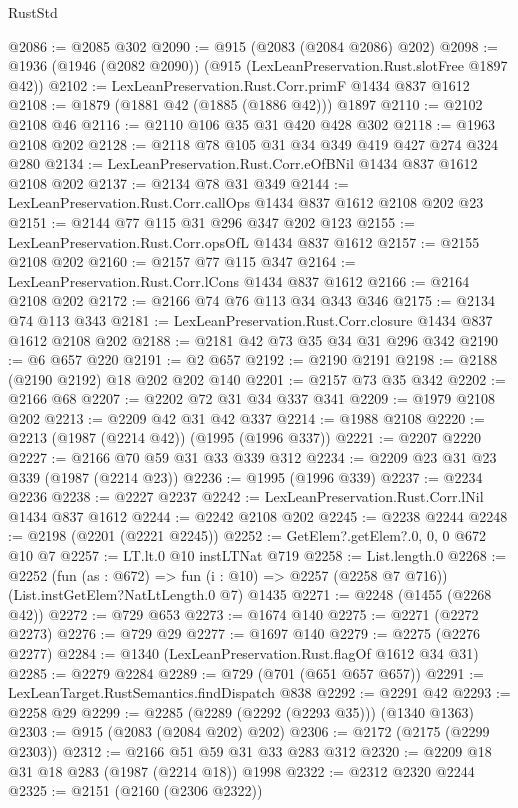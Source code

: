 \begin{lexlean}{RustStd}
\begin{coremodule}
@2086 := @2085 @302
@2090 := @915 (@2083 (@2084 @2086) @202)
@2098 := @1936 (@1946 (@2082 @2090)) (@915 (LexLeanPreservation.Rust.slotFree @1897 @42))
@2102 := LexLeanPreservation.Rust.Corr.primF @1434 @837 @1612
@2108 := @1879 (@1881 @42 (@1885 (@1886 @42))) @1897
@2110 := @2102 @2108 @46
@2116 := @2110 @106 @35 @31 @420 @428 @302
@2118 := @1963 @2108 @202
@2128 := @2118 @78 @105 @31 @34 @349 @419 @427 @274 @324 @280
@2134 := LexLeanPreservation.Rust.Corr.eOfBNil @1434 @837 @1612 @2108 @202
@2137 := @2134 @78 @31 @349
@2144 := LexLeanPreservation.Rust.Corr.callOps @1434 @837 @1612 @2108 @202 @23
@2151 := @2144 @77 @115 @31 @296 @347 @202 @123
@2155 := LexLeanPreservation.Rust.Corr.opsOfL @1434 @837 @1612
@2157 := @2155 @2108 @202
@2160 := @2157 @77 @115 @347
@2164 := LexLeanPreservation.Rust.Corr.lCons @1434 @837 @1612
@2166 := @2164 @2108 @202
@2172 := @2166 @74 @76 @113 @34 @343 @346
@2175 := @2134 @74 @113 @343
@2181 := LexLeanPreservation.Rust.Corr.closure @1434 @837 @1612 @2108 @202
@2188 := @2181 @42 @73 @35 @34 @31 @296 @342
@2190 := @6 @657 @220
@2191 := @2 @657
@2192 := @2190 @2191
@2198 := @2188 (@2190 @2192) @18 @202 @202 @140
@2201 := @2157 @73 @35 @342
@2202 := @2166 @68
@2207 := @2202 @72 @31 @34 @337 @341
@2209 := @1979 @2108 @202
@2213 := @2209 @42 @31 @42 @337
@2214 := @1988 @2108
@2220 := @2213 (@1987 (@2214 @42)) (@1995 (@1996 @337))
@2221 := @2207 @2220
@2227 := @2166 @70 @59 @31 @33 @339 @312
@2234 := @2209 @23 @31 @23 @339 (@1987 (@2214 @23))
@2236 := @1995 (@1996 @339)
@2237 := @2234 @2236
@2238 := @2227 @2237
@2242 := LexLeanPreservation.Rust.Corr.lNil @1434 @837 @1612
@2244 := @2242 @2108 @202
@2245 := @2238 @2244
@2248 := @2198 (@2201 (@2221 @2245))
@2252 := GetElem?.getElem?.{0, 0, 0} @672 @10 @7
@2257 := LT.lt.{0} @10 instLTNat @719
@2258 := List.length.{0}
@2268 := @2252
    (fun (as : @672) => fun (i : @10) => @2257 (@2258 @7 @716))
    (List.instGetElem?NatLtLength.{0} @7)
    @1435
@2271 := @2248 (@1455 (@2268 @42))
@2272 := @729 @653
@2273 := @1674 @140
@2275 := @2271 (@2272 @2273)
@2276 := @729 @29
@2277 := @1697 @140
@2279 := @2275 (@2276 @2277)
@2284 := @1340 (LexLeanPreservation.Rust.flagOf @1612 @34 @31)
@2285 := @2279 @2284
@2289 := @729 (@701 (@651 @657 @657))
@2291 := LexLeanTarget.RustSemantics.findDispatch @838
@2292 := @2291 @42
@2293 := @2258 @29
@2299 := @2285 (@2289 (@2292 (@2293 @35))) (@1340 @1363)
@2303 := @915 (@2083 (@2084 @202) @202)
@2306 := @2172 (@2175 (@2299 @2303))
@2312 := @2166 @51 @59 @31 @33 @283 @312
@2320 := @2209 @18 @31 @18 @283 (@1987 (@2214 @18)) @1998
@2322 := @2312 @2320 @2244
@2325 := @2151 (@2160 (@2306 @2322))

\end{coremodule}
\end{lexlean}
